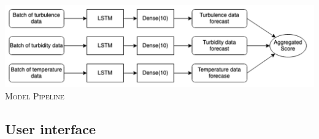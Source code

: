 \documentclass{article}
\begin{document}
\begin{multicols}{2}
\begin{center}
    \includegraphics[width=\columnwidth]{report/images/model.png}\\
    \textsc{Model Pipeline}
\end{center}

\end{multicols}

\subsection{User interface}
\end{document}
